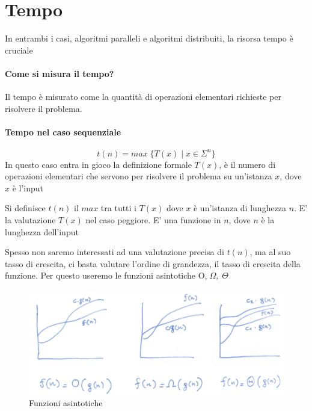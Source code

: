 \section{Tempo}
\begin{osservazione}
In entrambi i casi, algoritmi paralleli e algoritmi distribuiti, la risorsa tempo è cruciale
\end{osservazione}

\paragraph{Come si misura il tempo?} Il tempo è misurato come la quantità di operazioni elementari richieste per risolvere il problema. 

\paragraph{Tempo nel caso sequenziale} 
$$t(n) = max\;\{T(x)\;|\;x \in \Sigma^n\}$$
In questo caso entra in gioco la definizione formale $T(x)$, è il numero di operazioni elementari che servono per risolvere il problema su un'istanza $x$, dove $x$ è l'input 

Si definisce $t(n)$ il $max$ tra tutti i $T(x)$ dove $x$ è un'istanza di lunghezza $n$. E' la valutazione $T(x)$ nel caso peggiore. E' una funzione in $n$, dove $n$ è la lunghezza dell'input

\begin{osservazione}
    Spesso non saremo interessati ad una valutazione precisa di $t(n)$, ma al suo tasso di crescita, ci basta valutare l'ordine di grandezza, il tasso di crescita della funzione. Per questo useremo le funzioni asintotiche  O,$\;\Omega, \;\Theta$
\end{osservazione}

\begin{figure}[h]
    \centering
    \includegraphics[scale=0.4]{images/funzioni_asintotiche.png}
    \caption{Funzioni asintotiche}
\end{figure}

